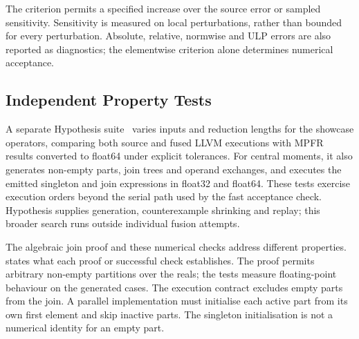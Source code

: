The criterion permits a specified increase over the source error or sampled sensitivity.
Sensitivity is measured on local perturbations, rather than bounded for every perturbation.
Absolute, relative, normwise and ULP errors are also reported as diagnostics; the elementwise criterion alone determines numerical acceptance.

\subsection{Independent Property Tests}
\label{sec:accuracy-limits}

A separate Hypothesis suite~\citep{hypothesis} varies inputs and reduction lengths for the showcase operators, comparing both source and fused LLVM executions with MPFR results converted to float64 under explicit tolerances.
For central moments, it also generates non-empty parts, join trees and operand exchanges, and executes the emitted singleton and join expressions in float32 and float64.
These tests exercise execution orders beyond the serial path used by the fast acceptance check.
Hypothesis supplies generation, counterexample shrinking and replay; this broader search runs outside individual fusion attempts.

The algebraic join proof and these numerical checks address different properties.
 states what each proof or successful check establishes.
The proof permits arbitrary non-empty partitions over the reals; the tests measure floating-point behaviour on the generated cases.
The execution contract excludes empty parts from the join.
A parallel implementation must initialise each active part from its own first element and skip inactive parts.
The singleton initialisation is not a numerical identity for an empty part.

